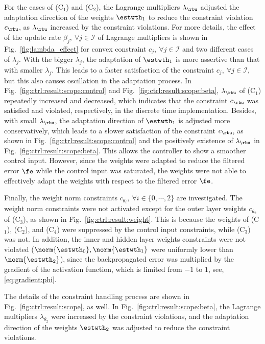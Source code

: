 \documentclass[lettersize,journal]{IEEEtran}
\begin{document}
For the cases of (C$_1$) and (C$_2$), the Lagrange multipliers $\lambda_{\rbu}$ adjusted the adaptation direction of the weights $\estwth_1$ to reduce the constraint violation $c_{\rbu}$, as $\lambda_{\rbu}$ increased by the constraint violations.
For more details, the effect of the update rate $\beta_j,\ \forall j\in\mathcal I$ of Lagrange multipliers is shown in Fig.~\ref{fig:lambda_effect} for convex constraint $c_j,\ \forall j\in\mathcal I$ and two different cases of $\lambda_j$.
With the bigger $\lambda_j$, the adaptation of $\estwth_1$ is more assertive than that with smaller $\lambda_j$.
This leads to a faster satisfaction of the constraint $c_j,\ \forall j\in\mathcal I$, but this also causes oscillation in the adaptation process.
In Fig.~\ref{fig:ctrl:result:scope:control} and Fig.~\ref{fig:ctrl:result:scope:beta}, $\lambda_{\rbu}$ of (C$_1$) repeatedly increased and decreased, which indicates that the constraint $c_{\rbu}$ was satisfied and violated, respectively, in the discrete time implementation.
Besides, with small $\lambda_{\rbu}$, the adaptation direction of $\estwth_1$ is adjusted more conservatively, which leads to a slower satisfaction of the constraint $c_{\rbu}$, as shown in Fig.~\ref{fig:ctrl:result:scope:control} and the positively existence of $\lambda_{\rbu}$ in Fig.~\ref{fig:ctrl:result:scope:beta}.
This allows the controller to show a smoother control input.
However, since the weights were adapted to reduce the filtered error $\fe$ while the control input was saturated, the weights were not able to effectively adapt the weights with respect to the filtered error $\fe$.

\hfill 

Finally, the weight norm constraints $c_{\theta_i},\ \forall i\in\{0,\cdots,2\}$ are investigated.
The weight norm constraints were not activated except for the outer layer weights $c_{\theta_2}$ of (C$_3$), as shown in Fig.~\ref{fig:ctrl:result:weight}.
This is because the weights of (C$_1$), (C$_2$), and (C$_4$) were suppressed by the control input constraints, while (C$_3$) was not.
In addition, the inner and hidden layer weights constraints were not violated (\ie $\norm{\estwth_0},\norm{\estwth_1}$ were uniformly lower than $\norm{\estwth_2}$), since the backpropagated error was multiplied by the gradient of the activation function, which is limited from $-1$ to $1$, \ie see, \eqref{eq:gradient:phi}.  

The details of the constraint handling process are shown in Fig.~\ref{fig:ctrl:result:scope}, as well.
In Fig.~\ref{fig:ctrl:result:scope:beta}, the Lagrange multipliers $\lambda_{\theta_2}$ were increased by the constraint violations, and the adaptation direction of the weights $\estwth_2$ was adjusted to reduce the constraint violations.
\end{document}
